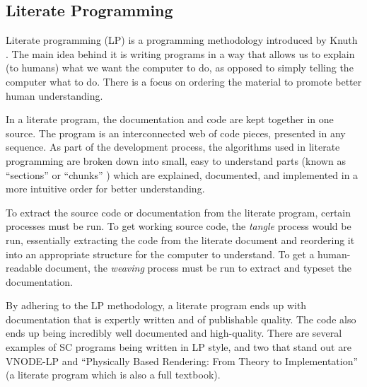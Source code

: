 \documentclass{sig-alternate-05-2015}
\begin{document}

\subsection{Literate Programming} \label{ssec:literate}

Literate programming (LP) is a programming methodology introduced by Knuth
\cite{Knuth1984}. The main idea behind it is writing programs in a way that
allows us to explain (to humans) what we want the computer to do, as opposed to
simply telling the computer what to do. There is a focus on ordering the
material to promote better human understanding.

In a literate program, the documentation and code are kept together in one
source. The program is an interconnected web of code pieces, presented in any
sequence. As part of the development process, the algorithms used in literate
programming are broken down into small, easy to understand parts (known as
``sections'' \cite{Knuth1984} or ``chunks'' \cite{Johnson1997}) which are
explained, documented, and implemented in a more intuitive order for better
understanding.

To extract the source code or documentation from the literate program,
certain processes must be run. To get working source code, the \textit{tangle}
process would be run, essentially extracting the code from the literate document
and reordering it into an appropriate structure for the computer to
understand.  To get a human-readable document, the \textit{weaving}
process must be run to extract and typeset the documentation.

By adhering to the LP methodology, a literate program ends up with documentation
that is expertly written and of publishable quality. The code also ends up being
incredibly well documented and high-quality. There are several examples of SC
programs being written in LP style, and two that stand out are VNODE-LP
\cite{Nedialkov2006} and ``Physically Based Rendering: From Theory to
Implementation'' \cite{PharrAndHumphreys2004} (a literate program which is also
a full textbook).
\end{document}
